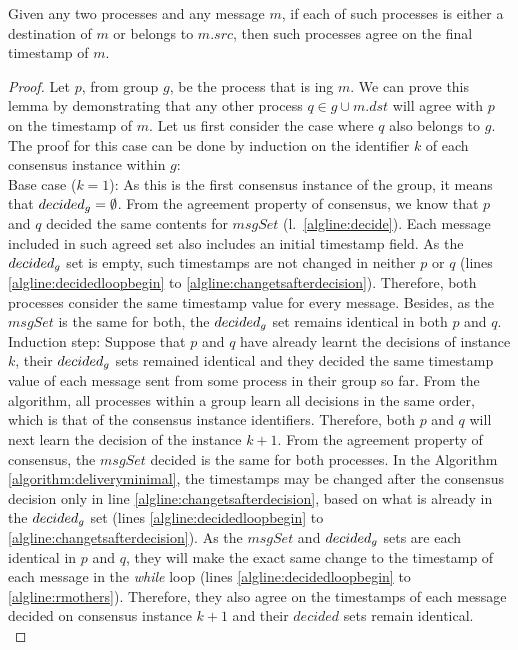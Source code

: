 \documentclass[times, 10pt]{article}
\begin{document}
\begin{lems} \label{lemma:agreetimestamps}
Given any two processes and any message $m$, if each of such processes is either a destination of $m$ or belongs to $m.src$, then such processes agree on the final timestamp of $m$.
\end{lems}

\begin{proof}
Let $p$, from group $g$, be the process that is \amcast{}ing $m$. We can prove this lemma by demonstrating that any other process $q \in g \cup m.dst$ will agree with $p$ on the timestamp of $m$. Let us first consider the case where $q$ also belongs to $g$. The proof for this case can be done by induction on the identifier $k$ of each consensus instance within $g$:\\

\noindent Base case ($k=1$): As this is the first consensus instance of the group, it means that $decided\text{$_g$} = \emptyset$. From the agreement property of consensus, we know that $p$ and $q$ decided the same contents for $msgSet$ \mbox{(l. \ref{algline:decide})}. Each message included in such agreed set also includes an initial timestamp field. As the $decided\text{$_g$}$ set is empty, such timestamps are not changed in neither $p$ or $q$ (lines \ref{algline:decidedloopbegin} to \ref{algline:changetsafterdecision}). Therefore, both processes consider the same timestamp value for every message. Besides, as the $msgSet$ is the same for both, the $decided\text{$_g$}$ set remains identical in both $p$ and $q$.\\

\noindent Induction step: Suppose that $p$ and $q$ have already learnt the decisions of instance $k$, their $decided\text{$_g$}$ sets remained identical and they decided the same timestamp value of each message sent from some process in their group so far. From the algorithm, all processes within a group learn all decisions in the same order, which is that of the consensus instance identifiers. Therefore, both $p$ and $q$ will next learn the decision of the instance $k+1$. From the agreement property of consensus, the $msgSet$ decided is the same for both processes. In the Algorithm \ref{algorithm:deliveryminimal}, the timestamps may be changed after the consensus decision only in line \ref{algline:changetsafterdecision}, based on what is already in the $decided\text{$_g$}$ set (lines \ref{algline:decidedloopbegin} to \ref{algline:changetsafterdecision}). As the $msgSet$ and $decided\text{$_g$}$ sets are each identical in $p$ and $q$, they will make the exact same change to the timestamp of each message in the \textit{while} loop (lines \ref{algline:decidedloopbegin} to \ref{algline:rmothers}). Therefore, they also agree on the timestamps of each message decided on consensus instance $k+1$ and their $decided$ sets remain identical.\\


\end{proof}
\end{document}
